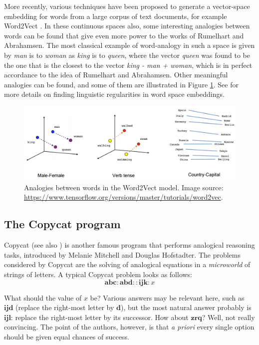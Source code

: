 More recently, various techniques have been proposed to generate a vector-space
embedding for words from a large corpus of text documents, for example
Word2Vect \cite{MikCheCorDea13}. In these continuous spaces also, some
interesting analogies between words can be found that give even more power to
the works of Rumelhart and Abrahamsen. The most classical example of
word-analogy in such a space is given by \textit{man} is to \textit{woman} as
\textit{king} is to \textit{queen}, where the vector
\textit{queen} was found to be the one that is the closest to the vector
\textit{king - man + woman}, which is in perfect accordance to the idea of
Rumelhart and Abrahamsen. Other meaningful analogies can be found, and some of
them are illustrated in Figure \ref{FIG:word_analogies}. See \cite{MikYihZwe13}
for more details on finding linguistic regularities in word space embeddings.
\begin{figure}[!h]
\centering
  \includegraphics[width=5in]{figures/word_analogies.png}
\caption{Analogies between words in the Word2Vect model. Image source:
  \url{https://www.tensorflow.org/versions/master/tutorials/word2vec}.}
  \label{FIG:word_analogies}
\end{figure}


\subsection{The Copycat program}
\label{SEC:copycat}

Copycat \cite{Mit93} (see also \cite{HofMit94}) is another famous program that
performs analogical reasoning tasks, introduced by Melanie Mitchell and Douglas
Hofstadter. The problems considered by Copycat are the solving of analogical
equations in a \textit{microworld} of strings of letters. A typical Copycat
problem looks as follows: $$\mathbf{abc} : \mathbf{abd} :: \mathbf{ijk} : x$$

What should the value of $x$ be? Various answers may be relevant here, such as
$\mathbf{ijd}$ (replace the right-most letter by $\mathbf{d}$), but the most
natural answer probably is $\mathbf{ijl}$: replace the right-most letter by its
successor. How about $\mathbf{zrq}$? Well, not really convincing. The point of
the authors, however, is that \textit{a priori} every single option should be
given equal chances of success.

